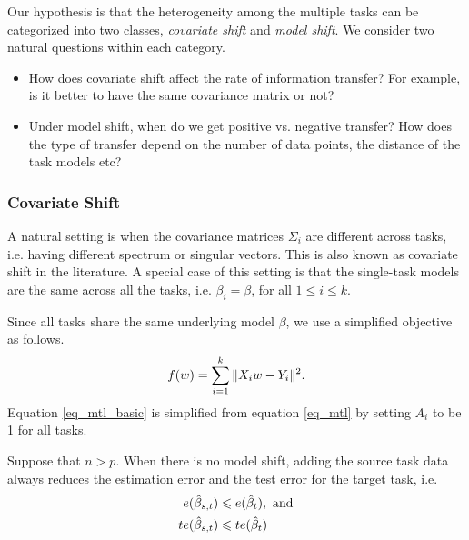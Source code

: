 Our hypothesis is that the heterogeneity among the multiple tasks can be categorized into two classes, \textit{covariate shift} and \textit{model shift}. %
We consider two natural questions within each category.
\begin{itemize}
	\item How does covariate shift affect the rate of information transfer? For example, is it better to have the same covariance matrix or not?
	\item Under model shift, when do we get positive vs. negative transfer? How does the type of transfer depend on the number of data points, the distance of the task models etc?
\end{itemize}



\subsubsection{Covariate Shift}

A natural setting is when the covariance matrices $\Sigma_i$ are different across tasks, i.e. having different spectrum or singular vectors.
This is also known as covariate shift in the literature.
A special case of this setting is that the single-task models are the same across all the tasks, i.e. $\beta_i = \beta$, for all $1\le i\le k$.

Since all tasks share the same underlying model $\beta$, we use a simplified objective as follows.
\begin{align}
	\label{eq_mtl_basic}
	f(w) = \sum_{i=1}^k \|X_i w - Y_i\|^2.
\end{align}
Equation \eqref{eq_mtl_basic} is simplified from equation \eqref{eq_mtl} by setting $A_i$ to be 1 for all tasks. %

\begin{proposition}\label{prop_monotone}
	Suppose that $n > p$.
  When there is no model shift, adding the source task data always reduces the estimation error and the test error for the target task, i.e.
	\begin{align}
		e(\hat{\beta}_{s,t})  &\leqslant e(\hat{\beta}_t), \text{ and} \label{eq_mono_e}\\
		te(\hat{\beta}_{s,t}) &\leqslant te(\hat{\beta}_t) \label{eq_mono_te}
	\end{align}
\end{proposition}

